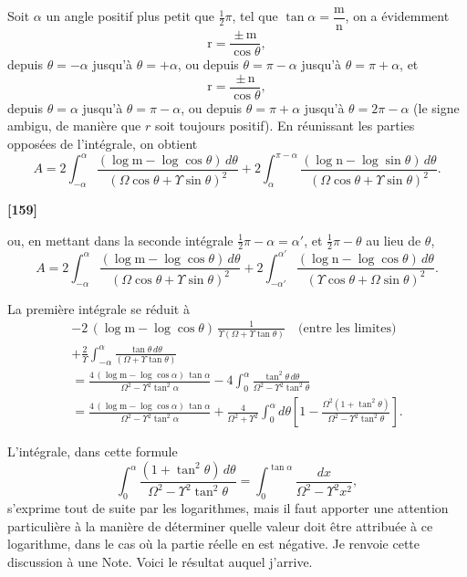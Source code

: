 \documentclass[11pt,a4paper]{book}
\begin{document}
Soit $\alpha$ un angle positif plus petit que $\tfrac{1}{2}\pi$, tel que $\tan\alpha = \dfrac{\mathrm{m}}{\mathrm{n}}$, on a \'evidemment
\[\mathrm{r} = \frac{\pm\, \mathrm{m}}{\cos\theta},\]
depuis $\theta = -\alpha$ jusqu'\`a $\theta = +\alpha$, ou depuis $\theta = \pi - \alpha$ jusqu'\`a $\theta = \pi + \alpha$, et
\[\mathrm{r} = \frac{\pm\, \mathrm{n}}{\cos\theta},\]
depuis $\theta = \alpha$ jusqu'\`a $\theta = \pi - \alpha$, ou depuis $\theta = \pi + \alpha$ jusqu'\`a $\theta = 2\pi - \alpha$ (le signe ambigu,
de mani\`ere que $r$ soit toujours positif). En r\'eunissant les parties oppos\'ees de l'int\'egrale,
on obtient
\[A = 2\int_{-\alpha}^{\alpha} \frac{(\log \mathrm{m} - \log\cos\theta)\, d\theta}{(\Omega\cos\theta + \Upsilon\sin\theta)^2}
+ 2\int_{\alpha}^{\pi-\alpha} \frac{(\log \mathrm{n} - \log\sin\theta)\, d\theta}{(\Omega\cos\theta + \Upsilon\sin\theta)^2}.\]

\textbf{[159]}

ou, en mettant dans la seconde int\'egrale $\tfrac{1}{2}\pi - \alpha = \alpha'$, et $\tfrac{1}{2}\pi - \theta$ au lieu de $\theta$,
\[A = 2\int_{-\alpha}^{\alpha} \frac{(\log \mathrm{m} - \log\cos\theta)\, d\theta}{(\Omega\cos\theta + \Upsilon\sin\theta)^2}
+ 2\int_{-\alpha'}^{\alpha'} \frac{(\log \mathrm{n} - \log\cos\theta)\, d\theta}{(\Upsilon\cos\theta + \Omega\sin\theta)^2}.\]

La premi\`ere int\'egrale se r\'eduit \`a
\begin{multline*}
-2\, (\log \mathrm{m} - \log\cos\theta)\, \frac{1}{\Upsilon(\Omega + \Upsilon\tan\theta)} \quad \text{(entre les limites)}\\
+ \frac{2}{\Upsilon} \int_{-\alpha}^{\alpha} \frac{\tan\theta\, d\theta}{(\Omega + \Upsilon\tan\theta)}\\
= \frac{4\, (\log \mathrm{m} - \log\cos\alpha)\, \tan\alpha}{\Omega^2 - \Upsilon^2\tan^2\alpha}
- 4\int_0^{\alpha} \frac{\tan^2\theta\, d\theta}{\Omega^2 - \Upsilon^2\tan^2\theta}\\
= \frac{4\, (\log \mathrm{m} - \log\cos\alpha)\, \tan\alpha}{\Omega^2 - \Upsilon^2\tan^2\alpha}
+ \frac{4}{\Omega^2 + \Upsilon^2} \int_0^{\alpha} d\theta \left[1 - \frac{\Omega^2(1 + \tan^2\theta)}{\Omega^2 - \Upsilon^2\tan^2\theta}\right].
\end{multline*}

L'int\'egrale, dans cette formule
\[\int_0^{\alpha} \frac{(1 + \tan^2\theta)\, d\theta}{\Omega^2 - \Upsilon^2\tan^2\theta}
= \int_0^{\tan\alpha} \frac{dx}{\Omega^2 - \Upsilon^2 x^2},\]
s'exprime tout de suite par les logarithmes, mais il faut apporter une attention
particuli\`ere \`a la mani\`ere de d\'eterminer quelle valeur doit \^etre attribu\'ee \`a ce logarithme,
dans le cas o\`u la partie r\'eelle en est n\'egative. Je renvoie cette discussion \`a une
Note. Voici le r\'esultat auquel j'arrive.
\end{document}
